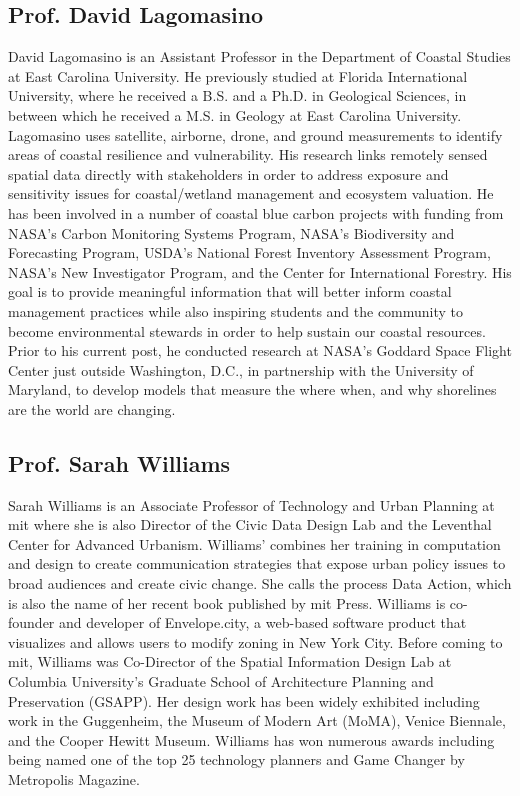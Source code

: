 \documentclass[notitlepage]{report}
\begin{document}
\subsection*{Prof. David Lagomasino}

David Lagomasino is an Assistant Professor in the Department of Coastal Studies at East Carolina University. He previously studied at Florida International University, where he received a B.S. and a Ph.D. in Geological Sciences, in between which he received a M.S. in Geology at East Carolina University. Lagomasino uses satellite, airborne, drone, and ground measurements to identify areas of coastal resilience and vulnerability. His research links remotely sensed spatial data directly with stakeholders in order to address exposure and sensitivity issues for coastal/wetland management and ecosystem valuation. He has been involved in a number of  coastal blue carbon projects with funding from NASA’s Carbon Monitoring Systems Program,  NASA’s Biodiversity and Forecasting Program, USDA’s National Forest Inventory Assessment Program,  NASA’s New Investigator Program, and the Center for International Forestry. His goal is to provide meaningful information that will better inform coastal management practices while also inspiring students and the community to become environmental stewards in order to help sustain our coastal resources. Prior to his current post, he conducted research at NASA’s Goddard Space Flight Center just outside Washington, D.C., in partnership with the University of Maryland, to develop models that measure the where when, and why shorelines are the world are changing.

\subsection*{Prof. Sarah Williams}

Sarah Williams is an Associate Professor of Technology and Urban Planning at \ac{mit} where she is also Director of the Civic Data Design Lab and the Leventhal Center for Advanced Urbanism. Williams’ combines her training in computation and design to create communication strategies that expose urban policy issues to broad audiences and create civic change. She calls the process Data Action, which is also the name of her recent book published by \ac{mit} Press. Williams is co-founder and developer of Envelope.city, a web-based software product that visualizes and allows users to modify zoning in New York City.  Before coming to \ac{mit}, Williams was Co-Director of the Spatial Information Design Lab at Columbia University’s Graduate School of Architecture Planning and Preservation (GSAPP). Her design work has been widely exhibited including work in the Guggenheim, the Museum of Modern Art (MoMA), Venice Biennale, and the Cooper Hewitt Museum. Williams has won numerous awards including being named one of the top 25 technology planners and Game Changer by Metropolis Magazine. 
\end{document}
